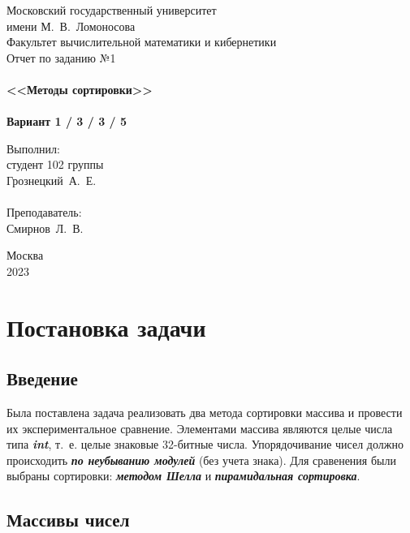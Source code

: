 \documentclass[a4paper,12pt,titlepage,finall]{article}
\begin{document}
\begin{titlepage}
    \begin{center}
	{\small \sc Московский государственный университет \\имени М.~В.~Ломоносова\\
	Факультет вычислительной математики и кибернетики\\}
	\vfill
	{\Large \sc Отчет по заданию №1}\\
	~\\
	{\large \bf <<Методы сортировки>>}\\ 
	~\\
	{\large \bf Вариант 1 / 3 / 3 / 5}
    \end{center}
    \begin{flushright}
	\vfill {Выполнил:\\
	студент 102 группы\\
	Грознецкий~А.~Е.\\
	~\\
	Преподаватель:\\
	Смирнов~Л.~В.}
    \end{flushright}
    \begin{center}
	\vfill
	{\small Москва\\2023}
    \end{center}
\end{titlepage}

\tableofcontents
\newpage

\section{Постановка задачи}

\subsection{Введение}

Была поставлена задача реализовать два метода сортировки массива и провести их экспериментальное сравнение. Элементами массива являются целые числа типа \textbf{\textit{int}},  т.~е.  целые знаковые 32-битные числа. Упорядочивание чисел должно происходить \textbf{\textit{по неубыванию модулей}} (без учета знака). Для сравенения были выбраны сортировки: \textbf{\textit{методом Шелла}} и \textbf{\textit{пирамидальная сортировка}}.

\subsection{Массивы чисел}
\end{document}
